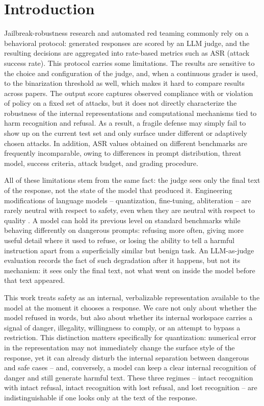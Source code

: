 \documentclass[10pt,twocolumn]{article}
\begin{document}
{\renewcommand{\thefootnote}{\fnsymbol{footnote}}}

\section{Introduction}
\label{sec:intro}

Jailbreak-robustness research and automated red teaming commonly rely on a behavioral protocol: generated responses are scored by an LLM judge, and the resulting decisions are aggregated into rate-based metrics such as ASR (attack success rate). This protocol carries some limitations. The results are sensitive to the choice and configuration of the judge, and, when a continuous grader is used, to the binarization threshold as well, which makes it hard to compare results across papers. The output score captures observed compliance with or violation of policy on a fixed set of attacks, but it does not directly characterize the robustness of the internal representations and computational mechanisms tied to harm recognition and refusal. As a result, a fragile defense may simply fail to show up on the current test set and only surface under different or adaptively chosen attacks. In addition, ASR values obtained on different benchmarks are frequently incomparable, owing to differences in prompt distribution, threat model, success criteria, attack budget, and grading procedure.

All of these limitations stem from the same fact: the judge sees only the final text of the response, not the state of the model that produced it. Engineering modifications of language models -- quantization, fine-tuning, abliteration -- are rarely neutral with respect to safety, even when they are neutral with respect to quality \citep{hong2024decoding, qi2023finetuningalignedlanguagemodels}. A model can hold its previous level on standard benchmarks while behaving differently on dangerous prompts: refusing more often, giving more useful detail where it used to refuse, or losing the ability to tell a harmful instruction apart from a superficially similar but benign task. An LLM-as-judge evaluation records the fact of such degradation after it happens, but not its mechanism: it sees only the final text, not what went on inside the model before that text appeared.

This work treats safety as an internal, verbalizable representation available to the model at the moment it chooses a response. We care not only about whether the model refused in words, but also about whether its internal workspace carries a signal of danger, illegality, willingness to comply, or an attempt to bypass a restriction. This distinction matters specifically for quantization: numerical error in the representation may not immediately change the surface style of the response, yet it can already disturb the internal separation between dangerous and safe cases -- and, conversely, a model can keep a clear internal recognition of danger and still generate harmful text. These three regimes -- intact recognition with intact refusal, intact recognition with lost refusal, and lost recognition -- are indistinguishable if one looks only at the text of the response.
\end{document}
